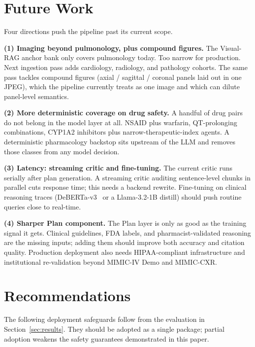 \documentclass[twocolumn,10pt,main=USenglish]{asmeconf}
\begin{document}
\section{Future Work}
\label{sec:future}
Four directions push the pipeline past its current scope.

\textbf{(1) Imaging beyond pulmonology, plus compound figures.}
The Visual-RAG anchor bank only covers pulmonology today. Too
narrow for production. Next ingestion pass adds cardiology,
radiology, and pathology cohorts. The same pass tackles compound
figures (axial / sagittal / coronal panels laid out in one JPEG),
which the pipeline currently treats as one image and which can
dilute panel-level semantics.

\textbf{(2) More deterministic coverage on drug safety.} A handful
of drug pairs do not belong in the model layer at all. NSAID plus
warfarin, QT-prolonging combinations, CYP1A2 inhibitors plus
narrow-therapeutic-index agents. A deterministic pharmacology
backstop sits upstream of the LLM and removes those classes from
any model decision.

\textbf{(3) Latency: streaming critic and fine-tuning.} The
current critic runs serially after plan generation. A streaming
critic auditing sentence-level chunks in parallel cuts response
time; this needs a backend rewrite. Fine-tuning on clinical
reasoning traces (DeBERTa-v3~\cite{he2021deberta} or a Llama-3.2-1B
distill) should push routine queries close to real-time.

\textbf{(4) Sharper Plan component.} The Plan layer is only as
good as the training signal it gets. Clinical guidelines, FDA
labels, and pharmacist-validated reasoning are the missing inputs;
adding them should improve both accuracy and citation quality.
Production deployment also needs HIPAA-compliant infrastructure
and institutional re-validation
beyond MIMIC-IV Demo and MIMIC-CXR.

\section{Recommendations}
\label{sec:recommendations}
The following deployment safeguards follow from the evaluation in
Section~\ref{sec:results}. They should be adopted as a single
package; partial adoption weakens the safety guarantees
demonstrated in this paper.
\end{document}
